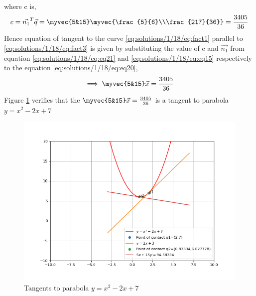 \begin{enumerate}
\begin{align}
	\end{align}
	where c is,
	\begin{align}
		c = \vec{n_1}^T\vec{q} = \myvec{5&15}\myvec{\frac{5}{6}\\\frac{217}{36}} = \frac{3405}{36} 
		\label{eq:solutions/1/18/eq:eq21}
	\end{align}
	Hence equation of tangent to the curve \eqref{eq:solutions/1/18/eq:fact1} parallel to \eqref{eq:solutions/1/18/eq:fact3} is given by substituting the value of c and $\vec{n_1}$ from equation \eqref{eq:solutions/1/18/eq:eq21} and \eqref{eq:solutions/1/18/eq:eq15} respectively to the equation \eqref{eq:solutions/1/18/eq:eq20},
	\begin{align}
		\implies\myvec{5&15}\vec{x} = \frac{3405}{36} 
	\end{align}
	Figure \ref{eq:solutions/1/18/eq:fig1} verifies that the $\myvec{5&15}\vec{x} = \frac{3405}{36}$ is a tangent to parabola  $y = x^2-2x+7$
	\begin{figure}
		\centering
		\includegraphics[width=\columnwidth]{./solutions/1/18/codes/parallelPerpendicularLineTangent.png}
		\caption{Tangents to parabola $y = x^2-2x+7$}
		\label{eq:solutions/1/18/eq:fig1}
	\end{figure}

	\end{enumerate}
		
	
